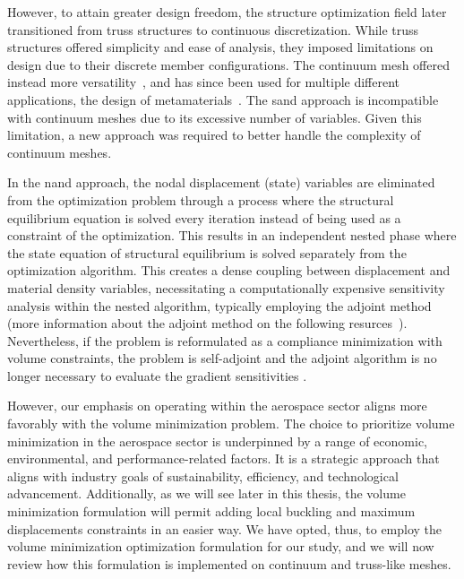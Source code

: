 However, to attain greater design freedom, the structure optimization field later transitioned from truss structures to continuous discretization. While truss structures offered simplicity and ease of analysis, they imposed limitations on design due to their discrete member configurations. The continuum mesh offered instead more versatility~, and has since been used for multiple different applications, \eg the design of metamaterials~. The \gls{sand} approach is incompatible with continuum meshes due to its excessive number of variables. Given this limitation, a new approach was required to better handle the complexity of continuum meshes.

In the \acrfull{nand} approach, the nodal displacement (state) variables are eliminated from the optimization problem through a process where the structural equilibrium equation is solved every iteration instead of being used as a constraint of the optimization. This results in an independent nested phase where the state equation of structural equilibrium is solved separately from the optimization algorithm. This creates a dense coupling between displacement and material density variables, necessitating a computationally expensive sensitivity analysis within the nested algorithm, typically employing the adjoint method (more information about the adjoint method on the following resurces~). Nevertheless, if the problem is reformulated as a compliance minimization with volume constraints, the problem is self-adjoint and the adjoint algorithm is no longer necessary to evaluate the gradient sensitivities .

However, our emphasis on operating within the aerospace sector aligns more favorably with the volume minimization problem. The choice to prioritize volume minimization in the aerospace sector is underpinned by a range of economic, environmental, and performance-related factors. It is a strategic approach that aligns with industry goals of sustainability, efficiency, and technological advancement. Additionally, as we will see later in this thesis, the volume minimization formulation will permit adding local buckling and maximum displacements constraints in an easier way. We have opted, thus, to employ the volume minimization optimization formulation for our study, and we will now review how this formulation is implemented on continuum and truss-like meshes.

